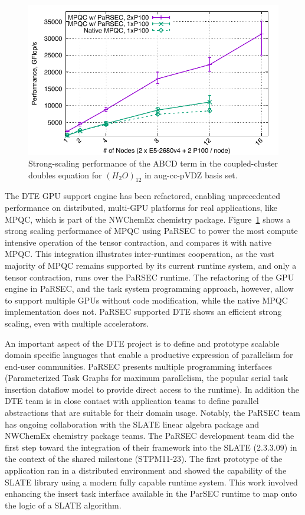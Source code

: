 \begin{figure}
  \centering\includegraphics[scale=0.55]{projects/2.3.1-PMR/2.3.1.09-ParSEC/cc_abcd.pdf}
  \caption{Strong-scaling performance of the ABCD term in the coupled-cluster doubles equation for $(H_2O)_{12}$ in aug-cc-pVDZ basis set.\label{fig:MPQC}}
\end{figure}
The DTE GPU support engine has been refactored, enabling unprecedented
performance on distributed, multi-GPU platforms for real applications,
like MPQC, which is part of the NWChemEx chemistry
package. Figure~\ref{fig:MPQC} shows a strong scaling performance of
MPQC using PaRSEC to power the most compute intensive operation of the
tensor contraction, and compares it with native MPQC. This
integration illustrates inter-runtimes cooperation, as the
vast majority of MPQC remains supported by its current runtime
system, and only a tensor contraction, runs over
the PaRSEC runtime.
The refactoring of the GPU engine in PaRSEC, and the task system programming
approach, however, allow to support multiple GPUs without code modification,
while the native MPQC implementation does not. PaRSEC supported DTE shows an
efficient strong scaling, even with multiple accelerators.

An important aspect of the DTE project is to define and prototype scalable
domain specific languages that enable a productive expression of parallelism for
end-user communities. PaRSEC presents multiple programming interfaces
(Parameterized Task Graphs for maximum parallelism, the popular serial task
insertion dataflow model to provide direct access to the runtime). In addition
the DTE team is in close contact with application teams to define parallel
abstractions that are suitable for their domain usage. Notably, the PaRSEC team
has ongoing collaboration with the SLATE linear algebra package and NWChemEx
chemistry package teams.
The PaRSEC development team did the first step toward the integration
of their framework into the SLATE (2.3.3.09) in the context of the
shared milestone (STPM11-23). The first prototype of the application
ran in a distributed environment and showed the capability of the
SLATE library using a modern fully capable runtime system. This work
involved enhancing the insert task interface available in the ParSEC
runtime to map onto the logic of a SLATE algorithm.

